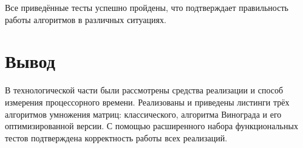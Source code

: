 \begin{table}[H]
\begin{center}
{\begin{tabular}{|x{1cm}|x{6cm}|x{3.5cm}|x{2.5cm}|x{4cm}|}
				
				
				
		\end{tabular}}
	\end{center}
\end{table}

Все приведённые тесты успешно пройдены, что подтверждает правильность работы алгоритмов в различных ситуациях.  

\section*{Вывод}

В технологической части были рассмотрены средства реализации и способ измерения процессорного времени. Реализованы и приведены листинги трёх алгоритмов умножения матриц: классического, алгоритма Винограда и его оптимизированной версии. С помощью расширенного набора функциональных тестов подтверждена корректность работы всех реализаций.  

\clearpage


